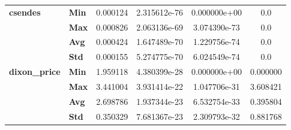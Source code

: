 \begin{longtable}{llcccc}
\cline{1-6}
\multirow{4}{*}{\textbf{csendes}} & \textbf{Min} &  0.000124 &  2.315612e-76 &  0.000000e+00 &  0.0 \\
        & \textbf{Max} &  0.000826 &  2.063136e-69 &  3.074390e-73 &  0.0 \\
        & \textbf{Avg} &  0.000424 &  1.647489e-70 &  1.229756e-74 &  0.0 \\
        & \textbf{Std} &  0.000155 &  5.274775e-70 &  6.024549e-74 &  0.0 \\
\cline{1-6}
\multirow{4}{*}{\textbf{dixon_price}} & \textbf{Min} &     1.959118 &  4.380399e-28 &  0.000000e+00 &     0.000000 \\
            & \textbf{Max} &     3.441004 &  3.931414e-22 &  1.047706e-31 &     3.608421 \\
            & \textbf{Avg} &     2.698786 &  1.937344e-23 &  6.532754e-33 &     0.395804 \\
            & \textbf{Std} &     0.350329 &  7.681367e-23 &  2.309793e-32 &     0.881768 \\
\end{longtable}

